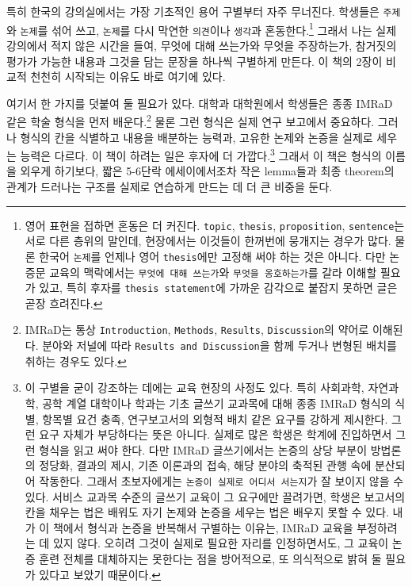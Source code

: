 특히 한국의 강의실에서는 가장 기초적인 용어 구별부터 자주 무너진다. 학생들은 \texttt{주제}와 \texttt{논제}를 섞어 쓰고, \texttt{논제}를 다시 막연한 \texttt{의견}이나 \texttt{생각}과 혼동한다.\footnote{영어 표현을 접하면 혼동은 더 커진다. \texttt{topic}, \texttt{thesis}, \texttt{proposition}, \texttt{sentence}는 서로 다른 층위의 말인데, 현장에서는 이것들이 한꺼번에 뭉개지는 경우가 많다. 물론 한국어 \texttt{논제}를 언제나 영어 \texttt{thesis}에만 고정해 써야 하는 것은 아니다. 다만 논증문 교육의 맥락에서는 \texttt{무엇에\ 대해\ 쓰는가}와 \texttt{무엇을\ 옹호하는가}를 갈라 이해할 필요가 있고, 특히 후자를 \texttt{thesis\ statement}에 가까운 감각으로 붙잡지 못하면 글은 곧장 흐려진다.} 그래서 나는 실제 강의에서 적지 않은 시간을 들여, 무엇에 대해 쓰는가와 무엇을 주장하는가, 참거짓의 평가가 가능한 내용과 그것을 담는 문장을 하나씩 구별하게 만든다. 이 책의 2장이 비교적 천천히 시작되는 이유도 바로 여기에 있다.

여기서 한 가지를 덧붙여 둘 필요가 있다. 대학과 대학원에서 학생들은 종종 IMRaD 같은 학술 형식을 먼저 배운다.\footnote{IMRaD는 통상 \texttt{Introduction}, \texttt{Methods}, \texttt{Results}, \texttt{Discussion}의 약어로 이해된다. 분야와 저널에 따라 \texttt{Results\ and\ Discussion}을 함께 두거나 변형된 배치를 취하는 경우도 있다.} 물론 그런 형식은 실제 연구 보고에서 중요하다. 그러나 형식의 칸을 식별하고 내용을 배분하는 능력과, 고유한 논제와 논증을 실제로 세우는 능력은 다르다. 이 책이 하려는 일은 후자에 더 가깝다.\footnote{이 구별을 굳이 강조하는 데에는 교육 현장의 사정도 있다. 특히 사회과학, 자연과학, 공학 계열 대학이나 학과는 기초 글쓰기 교과목에 대해 종종 IMRaD 형식의 식별, 항목별 요건 충족, 연구보고서의 외형적 배치 같은 요구를 강하게 제시한다. 그런 요구 자체가 부당하다는 뜻은 아니다. 실제로 많은 학생은 학계에 진입하면서 그런 형식을 읽고 써야 한다. 다만 IMRaD 글쓰기에서는 논증의 상당 부분이 방법론의 정당화, 결과의 제시, 기존 이론과의 접속, 해당 분야의 축적된 관행 속에 분산되어 작동한다. 그래서 초보자에게는 \texttt{논증이\ 실제로\ 어디서\ 서는지}가 잘 보이지 않을 수 있다. 서비스 교과목 수준의 글쓰기 교육이 그 요구에만 끌려가면, 학생은 보고서의 칸을 채우는 법은 배워도 자기 논제와 논증을 세우는 법은 배우지 못할 수 있다. 내가 이 책에서 형식과 논증을 반복해서 구별하는 이유는, IMRaD 교육을 부정하려는 데 있지 않다. 오히려 그것이 실제로 필요한 자리를 인정하면서도, 그 교육이 논증 훈련 전체를 대체하지는 못한다는 점을 방어적으로, 또 의식적으로 밝혀 둘 필요가 있다고 보았기 때문이다.} 그래서 이 책은 형식의 이름을 외우게 하기보다, 짧은 5-6단락 에세이에서조차 작은 lemma들과 최종 theorem의 관계가 드러나는 구조를 실제로 연습하게 만드는 데 더 큰 비중을 둔다.

